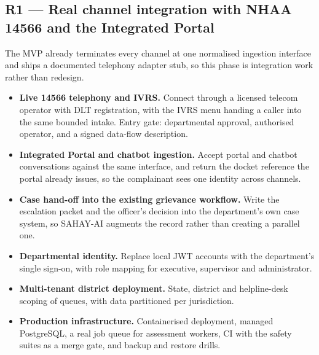 \documentclass[11pt,a4paper]{article}
\begin{document}
\subsection{R1 --- Real channel integration with NHAA 14566 and the Integrated Portal}
The MVP already terminates every channel at one normalised ingestion interface and ships a documented
telephony adapter stub, so this phase is integration work rather than redesign.

\begin{itemize}
  \item \textbf{Live 14566 telephony and IVRS.} Connect through a licensed telecom operator with DLT
        registration, with the IVRS menu handing a caller into the same bounded intake. Entry gate:
        departmental approval, authorised operator, and a signed data-flow description.
  \item \textbf{Integrated Portal and chatbot ingestion.} Accept portal and chatbot conversations
        against the same interface, and return the docket reference the portal already issues, so the
        complainant sees one identity across channels.
  \item \textbf{Case hand-off into the existing grievance workflow.} Write the escalation packet and
        the officer's decision into the department's own case system, so SAHAY-AI augments the record
        rather than creating a parallel one.
  \item \textbf{Departmental identity.} Replace local JWT accounts with the department's single
        sign-on, with role mapping for executive, supervisor and administrator.
  \item \textbf{Multi-tenant district deployment.} State, district and helpline-desk scoping of
        queues, with data partitioned per jurisdiction.
  \item \textbf{Production infrastructure.} Containerised deployment, managed PostgreSQL, a real job
        queue for assessment workers, CI with the safety suites as a merge gate, and backup and
        restore drills.
\end{itemize}
\end{document}
